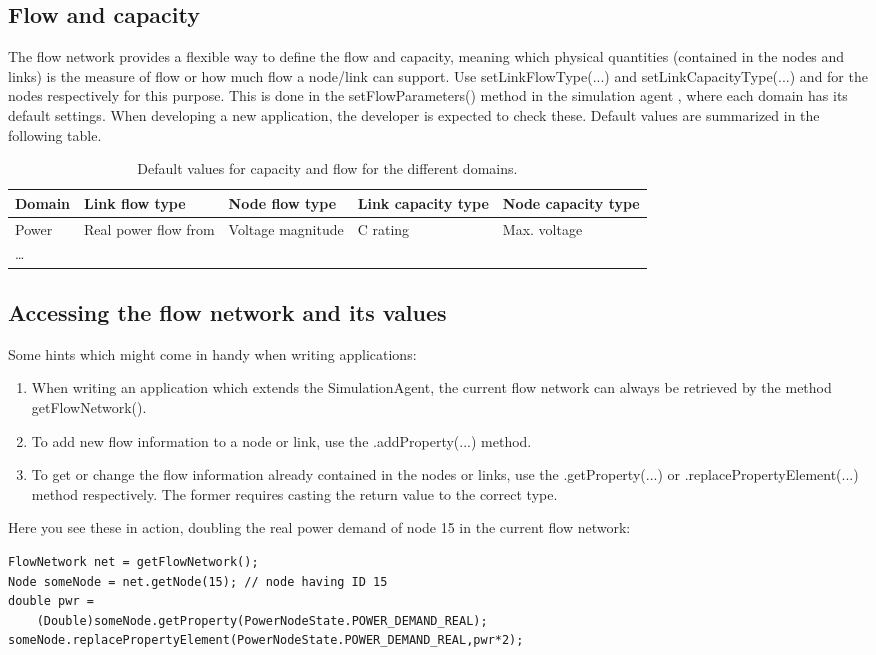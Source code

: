 \documentclass[11pt,fleqn]{book} %
\newcommand{\mainagent}{simulation agent }
\begin{document}
\subsection{Flow and capacity}
The flow network provides a flexible way to define the flow and capacity, meaning which physical quantities (contained in the nodes and links) is the measure of flow or how much flow a node/link can support. Use setLinkFlowType(...) and setLinkCapacityType(...) and for the nodes respectively for this purpose. This is done in the setFlowParameters() method in the \mainagent, where each domain has its default settings. When developing a new application, the developer is expected to check these. Default values are summarized in the following table.
\begin{table}[h]
	\centering
	\begin{tabular}{|l| p{2.5cm}| p{2.5cm}|l|l|}
	\hline
	\rowcolor{Gray}
	Domain & Link flow type & Node flow type & Link capacity type & Node capacity type\\
	\hline
	Power & Real power flow from & Voltage magnitude & C rating & Max. voltage\\
	\hline
	\dots &&&&\\
	\hline
	\end{tabular}
	\caption{Default values for capacity and flow for the different domains.}
	\label{table:flow_capacity}
\end{table}

\subsection{Accessing the flow network and its values}
Some hints which might come in handy when writing applications:
\begin{enumerate}
	\item When writing an application which extends the SimulationAgent, the current flow network can always be retrieved by the method getFlowNetwork().
	\item To add new flow information to a node or link, use the .addProperty(...) method.
	\item To get or change the flow information already contained in the nodes or links, use the .getProperty(...) or .replacePropertyElement(...) method respectively. The former requires casting the return value to the correct type.
\end{enumerate}

Here you see these in action, doubling the real power demand of node 15 in the current flow network:
\begin{lstlisting}[frame=single] 
FlowNetwork net = getFlowNetwork();
Node someNode = net.getNode(15); // node having ID 15
double pwr = 
	(Double)someNode.getProperty(PowerNodeState.POWER_DEMAND_REAL);
someNode.replacePropertyElement(PowerNodeState.POWER_DEMAND_REAL,pwr*2);
\end{lstlisting}
\end{document}

